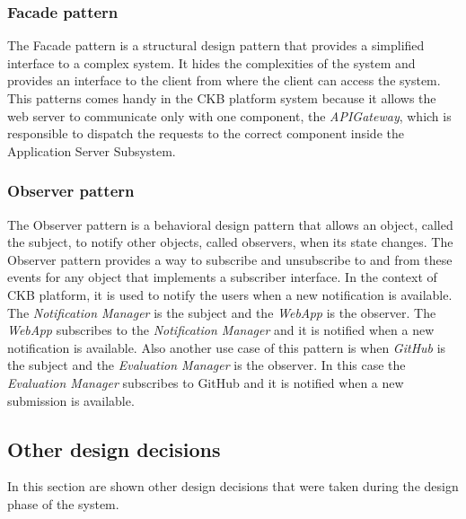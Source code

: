 \begin{itemize}
\subsubsection{Facade pattern}
The Facade pattern is a structural design pattern that provides a simplified interface to a complex system. It hides the complexities of the system and provides an interface to the client from where the client can access the system.
This patterns comes handy in the CKB platform system because it allows the web server to communicate only with one component, the \textit{APIGateway}, which is responsible to dispatch the requests to the correct component inside the Application Server Subsystem.
\subsubsection{Observer pattern}
The Observer pattern is a behavioral design pattern that allows an object, called the subject, to notify other objects, called observers, when its state changes. The Observer pattern provides a way to subscribe and unsubscribe to and from these events for any object that implements a subscriber interface. In the context of CKB platform, it is used to notify the users when a new notification is available. The \textit{Notification Manager} is the subject and the \textit{WebApp} is the observer. The \textit{WebApp} subscribes to the \textit{Notification Manager} and it is notified when a new notification is available. Also another use case of this pattern is when \textit{GitHub} is the subject and the \textit{Evaluation Manager} is the observer. In this case the \textit{Evaluation Manager} subscribes to GitHub and it is notified when a new submission is available.
\subsection{Other design decisions}
In this section are shown other design decisions that were taken during the design phase of the system.

\end{itemize}
